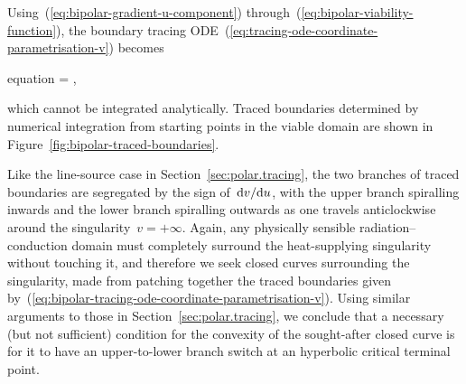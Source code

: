 Using~(\ref{eq:bipolar-gradient-u-component})
through~(\ref{eq:bipolar-viability-function}),
the boundary tracing ODE~(\ref{eq:tracing-ode-coordinate-parametrisation-v})
becomes
\begin{important}{equation}
   =
    \pm
    ,
  \label{eq:bipolar-tracing-ode-coordinate-parametrisation-v}
\end{important}
which cannot be integrated analytically.
Traced boundaries determined by numerical integration
from starting points in the viable domain
are shown in Figure~\ref{fig:bipolar-traced-boundaries}.

Like the line-source case in Section~\ref{sec:polar.tracing},
the two branches of traced boundaries are segregated
by the sign of~$\mathop{}\!\mathrm{d} v / {\mathop{}\!\mathrm{d} u}$,
with the upper branch spiralling inwards
and the lower branch spiralling outwards
as one travels anticlockwise
around the singularity~$v = +\infty$.
Again, any physically sensible radiation--conduction domain
must completely surround the heat-supplying singularity without touching it,
and therefore we seek closed curves surrounding the singularity,
made from patching together the traced boundaries
given by~(\ref{eq:bipolar-tracing-ode-coordinate-parametrisation-v}).
Using similar arguments to those in Section~\ref{sec:polar.tracing},
we conclude that a necessary (but not sufficient) condition
for the convexity of the sought-after closed curve
is for it to have an upper-to-lower branch switch
at an hyperbolic critical terminal point.

